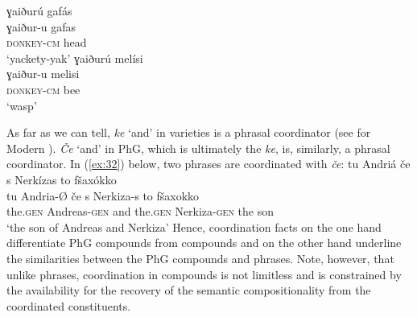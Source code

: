 \documentclass[output=paper]{LSP/langsci}
\begin{document}
\begin{multicols}{2}
	\ex\label{ex:31b}
		\glll	ɣaiðurú gafás\\
				ɣaiður-u gafas\\
				\textsc{donkey-cm} head\\
		\glt `yackety-yak'
	\ex\label{ex:31c}
		\glll ɣaiðurú melísi\\
				ɣaiður-u melisi\\
				\textsc{donkey-cm} bee\\
		\glt `wasp'
\end{multicols}
	\z
\z
As far as we can tell, \textit{ke} `and' in  varieties is a phrasal coordinator (see \citealt{Ingria2005} for Modern ). \textit{\v{C}e} `and' in PhG, which is ultimately the  \textit{ke}, is, similarly, a phrasal coordinator. In (\ref{ex:32}) below, two   phrases are coordinated with \textit{\v{c}e}:
\ea\label{ex:32}
	\glll 	tu Andriá če s Nerkízas to fšaxókko\\
			tu Andria-{\O}  če s Nerkiza-s to fšaxokko\\
			the.\textsc{gen} Andreas-\textsc{gen} and the.\textsc{gen} Nerkiza-\textsc{gen} the son\\
	\glt `the son of Andreas and Nerkiza'
\z
Hence, coordination facts on the one hand differentiate PhG compounds from  compounds and on the other hand underline the similarities between the PhG compounds and  phrases. Note, however, that unlike  phrases, coordination in compounds is not limitless and is constrained by the availability for the recovery of the semantic compositionality from the coordinated constituents. 
\end{document}
